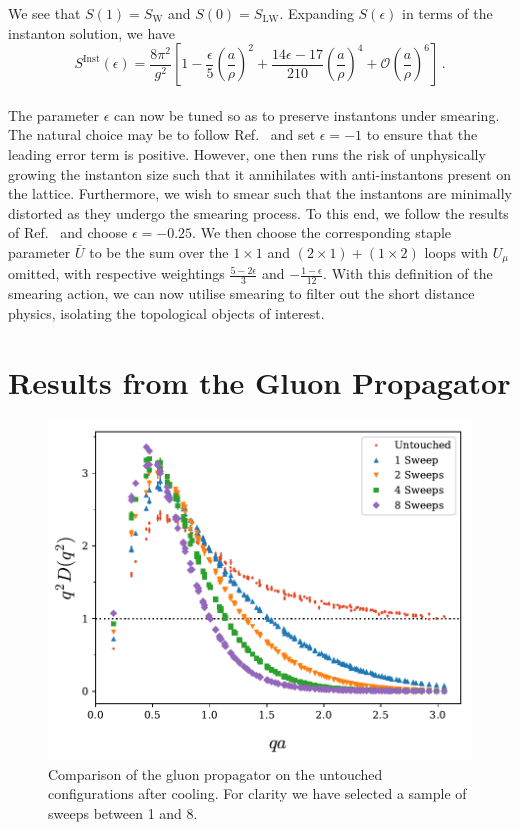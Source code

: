 %
We see that $S(1)=S_\text{W}$ and $S(0) = S_\text{LW}$. Expanding $S(\epsilon)$ in terms of the instanton solution, we have
%
\begin{equation}
S^\text{Inst}(\epsilon) = \frac { 8 \pi ^ { 2 } } { g ^ { 2 } } \left[ 1 - \frac { \epsilon } { 5 } \left( \frac { a } { \rho  } \right) ^ { 2 } + \frac { 14 \epsilon - 17 } { 210 } \left( \frac { a } { \rho } \right) ^ { 4 } + \mathcal { O } \left( \frac{a}{\rho} \right) ^ { 6 } \right]\, .
\end{equation}\\
%

The parameter $\epsilon$ can now be tuned so as to preserve instantons under smearing. The natural choice may be to follow Ref.~\cite{GarciaPerez:1993lic} and set $\epsilon=-1$ to ensure that the leading error term is positive. However, one then runs the risk of unphysically growing the instanton size such that it annihilates with anti-instantons present on the lattice. Furthermore, we wish to smear such that the instantons are minimally distorted as they undergo the smearing process. To this end, we follow the results of Ref.~\cite{Moran:2008ra} and choose $\epsilon = -0.25$. We then choose the corresponding staple parameter $\bar{U}$ to be the sum over the $1\times 1$ and $(2\times 1) + (1\times 2)$ loops with $U_\mu$ omitted, with respective weightings $\frac{5-2\epsilon}{3}$ and $-\frac{1-\epsilon}{12}$. With this definition of the smearing action, we can now utilise smearing to filter out the short distance physics, isolating the topological objects of interest.

\section{Results from the Gluon Propagator}\label{sec:CoolingGluProp}

\begin{figure}[tb]
\centering
\includegraphics[width=\linewidth]{./ScalarGluComp_q2_1to10sweeps.pdf}
\caption{\label{fig:1to10SweepsCooling}Comparison of the gluon propagator on the untouched configurations after cooling. For clarity we have selected a sample of sweeps between 1 and 8.}
\end{figure}
%

